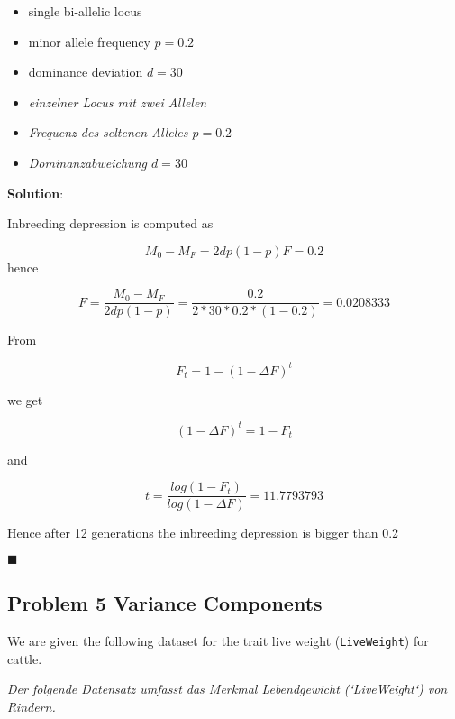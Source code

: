 \documentclass[
]{article}
\newcommand{\solstart}
{\vspace{3ex}\textbf{Solution}:}
\newcommand{\solend}
{\vspace{2ex}$\blacksquare$}
\begin{document}
\begin{itemize}
\item
  single bi-allelic locus
\item
  minor allele frequency \(p = 0.2\)
\item
  dominance deviation \(d = 30\)
\item
  \textit{einzelner Locus mit zwei Allelen}
\item
  \textit{Frequenz des seltenen Alleles $p = 0.2$}
\item
  \textit{Dominanzabweichung $d = 30$}
\end{itemize}

\solstart

Inbreeding depression is computed as

\[M_0 - M_F = 2dp(1-p)F = 0.2\] hence

\[F = \frac{M_0 - M_F}{2dp(1-p)} = \frac{0.2}{2 * 30 * 0.2 * (1- 0.2)} = 0.0208333\]

From

\[F_t = 1 - (1 - \Delta F)^t\]

we get

\[(1 - \Delta F)^t = 1-F_t\]

and

\[t = \frac{log(1-F_t)}{log(1 - \Delta F)} = 11.7793793\]

Hence after 12 generations the inbreeding depression is bigger than 0.2

\solend

\clearpage
\pagebreak

\hypertarget{problem-5-variance-components}{%
\subsection{Problem 5 Variance
Components}\label{problem-5-variance-components}}

We are given the following dataset for the trait live weight
(\texttt{LiveWeight}) for cattle.

\textit{Der folgende Datensatz umfasst das Merkmal Lebendgewicht (`LiveWeight`) von Rindern.}
\end{document}
